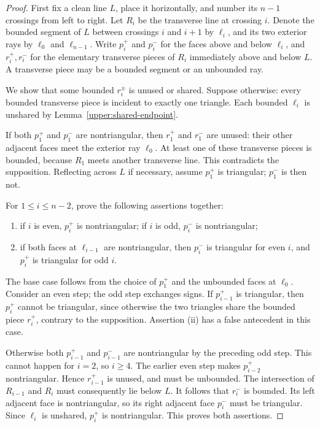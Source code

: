 \begin{proof}
First fix a clean line $L$, place it horizontally, and number its $n-1$ crossings from left to right. Let $R_i$ be the transverse line at crossing $i$. Denote the bounded segment of $L$ between crossings $i$ and $i+1$ by $\ell_i$, and its two exterior rays by $\ell_0$ and $\ell_{n-1}$. Write $p_i^+$ and $p_i^-$ for the faces above and below $\ell_i$, and $r_i^+,r_i^-$ for the elementary transverse pieces of $R_i$ immediately above and below $L$. A transverse piece may be a bounded segment or an unbounded ray.

We show that some bounded $r_i^{\pm}$ is unused or shared. Suppose otherwise: every bounded transverse piece is incident to exactly one triangle. Each bounded $\ell_i$ is unshared by Lemma~\ref{upper:shared-endpoint}.

If both $p_1^+$ and $p_1^-$ are nontriangular, then $r_1^+$ and $r_1^-$ are unused: their other adjacent faces meet the exterior ray $\ell_0$. At least one of these transverse pieces is bounded, because $R_1$ meets another transverse line. This contradicts the supposition. Reflecting across $L$ if necessary, assume $p_1^+$ is triangular; $p_1^-$ is then not.

For $1\le i\le n-2$, prove the following assertions together:
\begin{enumerate}[label=(\roman*)]
\item if $i$ is even, $p_i^+$ is nontriangular; if $i$ is odd, $p_i^-$ is nontriangular;
\item if both faces at $\ell_{i-1}$ are nontriangular, then $p_i^-$ is triangular for even $i$, and $p_i^+$ is triangular for odd $i$.
\end{enumerate}
The base case follows from the choice of $p_1^+$ and the unbounded faces at $\ell_0$. Consider an even step; the odd step exchanges signs. If $p_{i-1}^+$ is triangular, then $p_i^+$ cannot be triangular, since otherwise the two triangles share the bounded piece $r_i^+$, contrary to the supposition. Assertion (ii) has a false antecedent in this case.

Otherwise both $p_{i-1}^+$ and $p_{i-1}^-$ are nontriangular by the preceding odd step. This cannot happen for $i=2$, so $i\ge4$. The earlier even step makes $p_{i-2}^+$ nontriangular. Hence $r_{i-1}^+$ is unused, and must be unbounded. The intersection of $R_{i-1}$ and $R_i$ must consequently lie below $L$. It follows that $r_i^-$ is bounded. Its left adjacent face is nontriangular, so its right adjacent face $p_i^-$ must be triangular. Since $\ell_i$ is unshared, $p_i^+$ is nontriangular. This proves both assertions.


\end{proof}
